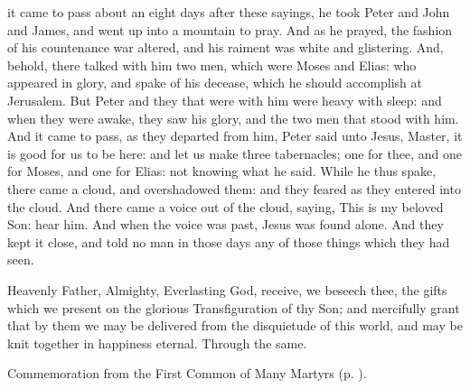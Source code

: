  it came to pass about an eight days after these sayings, he took Peter and John and James, and went up into a mountain to pray. And as he prayed, the fashion of his countenance war altered, and his raiment was white and glistering. And, behold, there talked with him two men, which were Moses and Elias: who appeared in glory, and spake of his decease, which he should accomplish at Jerusalem. But Peter and they that were with him were heavy with sleep: and when they were awake, they saw his glory, and the two men that stood with him. And it came to pass, as they departed from him, Peter said unto Jesus, Master, it is good for us to be here: and let us make three tabernacles; one for thee, and one for Moses, and one for Elias: not knowing what he said. While he thus spake, there came a cloud, and overshadowed them: and they feared as they entered into the cloud. And there came a voice out of the cloud, saying, This is my beloved Son: hear him. And when the voice was past, Jesus was found alone. And they kept it close, and told no man in those days any of those things which they had seen.


\vspace{-0.5\baselineskip}

\secret

\vspace{-0.25\baselineskip}

 Heavenly Father, Almighty, Everlasting God, receive, we beseech thee, the gifts which we present on the glorious Transfiguration of thy Son; and mercifully grant that by them we may be delivered from the disquietude of this world, and may be knit together in happiness eternal. Through the same.


\begin{rubric}
	 Commemoration  from the First Common of Many Martyrs (p. \pageref{CommonMartyrsISecret}).
\end{rubric}


\vspace{-0.4\baselineskip}

\postcommunion

